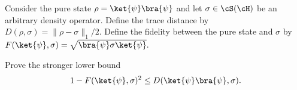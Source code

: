Consider the pure state $\rho=\ket{\psi}\bra{\psi}$ and let $\sigma\in \cS(\cH)$ be an arbitrary density operator. Define the trace distance by $D(\rho,\sigma) = \|\rho-\sigma\|_1/2.$ Define the fidelity between the pure state and $\sigma$ by $F(\ket{\psi},\sigma) = \sqrt{\bra{\psi}\sigma\ket{\psi}}.$

Prove the stronger lower bound
$$
1-F(\ket{\psi},\sigma)^2
\leq
D(\ket{\psi}\bra{\psi},\sigma).
$$
